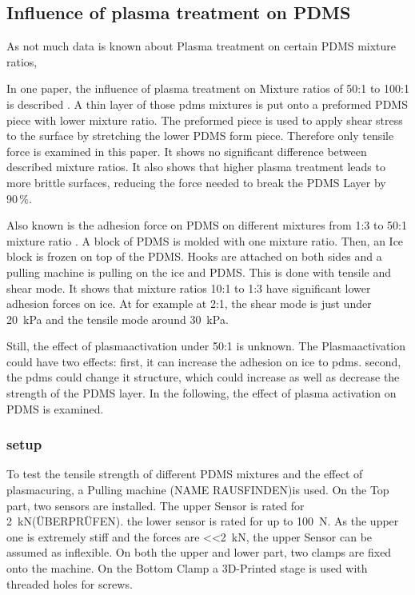 \subsection{Influence of plasma treatment on PDMS}

As not much data is known about Plasma treatment on certain PDMS mixture ratios, 

In one paper, the influence of plasma treatment on Mixture ratios of 50:1 to 100:1 is described  \cite{Ohishi.2017}. A thin layer of those pdms mixtures is put onto a preformed PDMS piece with lower mixture ratio. The preformed piece is used to apply shear stress to the surface by stretching the lower PDMS form piece. Therefore only tensile force is examined in this paper. It shows no significant difference between described mixture ratios. It also shows that higher plasma treatment leads to more brittle surfaces, reducing the force needed to break the PDMS Layer by $90\,\%$.

Also known is the adhesion force on PDMS on different mixtures from 1:3 to 50:1 mixture ratio \cite{IbanezIbanez.2022}. A block of PDMS is molded with one mixture ratio. Then, an Ice block is frozen on top of the PDMS. Hooks are attached on both sides and a pulling machine is pulling on the ice and PDMS. This is done with tensile and shear mode. It shows that mixture ratios 10:1 to 1:3 have significant lower adhesion forces on ice. At for example at 2:1, the shear mode is just under \SI{20}{\kilo\pascal} and the tensile mode around \SI{30}{\kilo\pascal}. 

Still, the effect of plasmaactivation under 50:1 is unknown. The Plasmaactivation could have two effects: first, it can increase the adhesion on ice to pdms. second, the pdms could change it structure, which could increase as well as decrease the strength of the PDMS layer. In the following, the effect of plasma activation on PDMS is examined.

\subsubsection{setup}

To test the tensile strength of different PDMS mixtures and the effect of plasmacuring, a Pulling machine (NAME RAUSFINDEN)is used. 
On the Top part, two sensors are installed. The upper Sensor is rated for \SI{2}{\kilo\newton}(ÜBERPRÜFEN). the lower sensor is rated for up to \SI{100}{\newton}. As the upper one is extremely stiff and the forces are \SI{<<2}{\kilo\newton}, the upper Sensor can be assumed as inflexible. On both the upper and lower part, two clamps are fixed onto the machine. On the Bottom Clamp a 3D-Printed stage is used with threaded holes for screws. 

